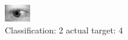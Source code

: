 \begin{figure}[h!]
\begin{center}
\includegraphics[width=0.60\columnwidth]{figures/ID829_class_2_target_4.png}
\end{center}
\caption{ Classification: 2 actual target: 4}
\label{fig:ID829_class_2_target_4}
\end{figure}
